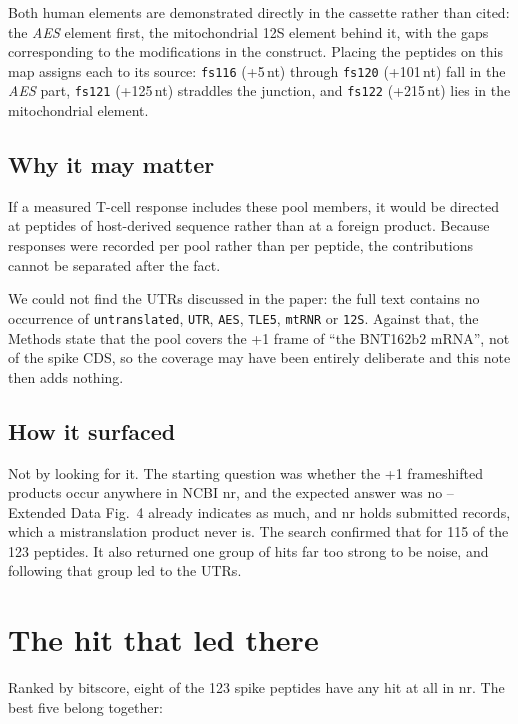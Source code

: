 \documentclass[11pt,a4paper]{article}
\begin{document}
Both human elements are demonstrated directly in the cassette rather than
cited: the \emph{AES} element first, the mitochondrial 12S element behind it,
with the gaps corresponding to the modifications in the construct. Placing the
peptides on this map assigns each to its source: \texttt{fs116} (+5\,nt)
through \texttt{fs120} (+101\,nt) fall in the \emph{AES} part, \texttt{fs121}
(+125\,nt) straddles the junction, and \texttt{fs122} (+215\,nt) lies in the
mitochondrial element.

\subsection*{Why it may matter}

If a measured T-cell response includes these pool members, it would be
directed at peptides of host-derived sequence rather than at a foreign
product. Because responses were recorded per pool rather than per peptide, the
contributions cannot be separated after the fact.

We could not find the UTRs discussed in the paper: the full text contains no
occurrence of \texttt{untranslated}, \texttt{UTR}, \texttt{AES},
\texttt{TLE5}, \texttt{mtRNR} or \texttt{12S}. Against that, the Methods state
that the pool covers the +1 frame of ``the BNT162b2 mRNA'', not of the spike
CDS, so the coverage may have been entirely deliberate and this note then adds
nothing.

\subsection*{How it surfaced}

Not by looking for it. The starting question was whether the +1 frameshifted
products occur anywhere in NCBI nr, and the expected answer was no --
Extended Data Fig.~4 already indicates as much, and nr holds submitted
records, which a mistranslation product never is. The search confirmed that
for 115 of the 123 peptides. It also returned one group of hits far too
strong to be noise, and following that group led to the UTRs.

\section{The hit that led there}
\label{sec:aehnlich}

Ranked by bitscore, eight of the 123 spike peptides have any hit at all in
nr. The best five belong together:
\end{document}
